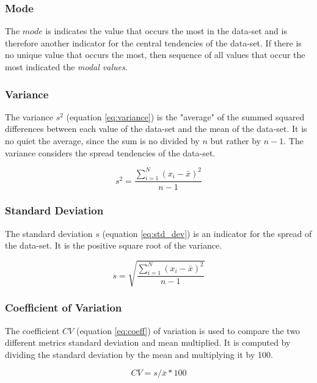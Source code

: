 \subsubsection{Mode}
The $mode$ \cite{ross2010statistics} is indicates the value that occurs the most in the data-set and is therefore another indicator for the central tendencies of the data-set. If there is no unique value that occurs the most, then sequence of all values that occur the most indicated the \textit{modal values}.

\subsubsection{Variance}
The variance $s^2$ \cite{ross2010statistics} (equation \ref{eq:variance}) is the "average" of the summed squared differences between each value of the data-set and the mean of the data-set. It is no quiet the average, since the sum is no divided by $n$ but rather by $n-1$. The variance considers the spread tendencies of the data-set.

\begin{equation}
s^{2}=\frac{\sum\limits_{i=1}^N (x_{i}-\bar{x})^2}{n-1}
\label{eq:variance}
\end{equation}

\subsubsection{Standard Deviation}
The standard deviation $s$ \cite{ross2010statistics} (equation \ref{eq:std_dev}) is an indicator for the spread of the data-set. It is the positive square root of the variance.

\begin{equation}
s=\sqrt{\frac{\sum\limits_{i=1}^N (x_{i}-\bar{x})^2}{n-1}}
\label{eq:std_dev}
\end{equation}

\subsubsection{Coefficient of Variation}
The coefficient $CV$ \cite{jain2021statisticsEconomics} (equation \ref{eq:coeff}) of variation is used to compare the two different metrics standard deviation and mean multiplied. It is computed by dividing the standard deviation by the mean and multiplying it by 100.

\begin{equation}
CV = s/\bar{x}*100
\label{eq:coeff}
\end{equation}

